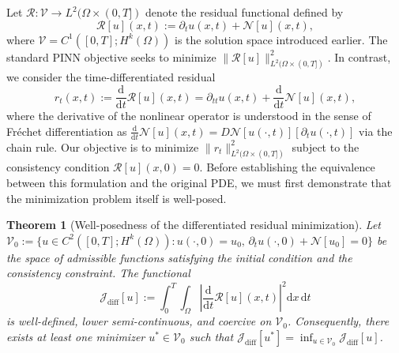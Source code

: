 \documentclass[11pt,reqno]{amsart}
\theoremstyle{plain}
\newtheorem{theorem}{Theorem}[section]
\theoremstyle{definition}
\theoremstyle{remark}
\begin{document}
\noindent Let $\mathcal{R}: \mathcal{V} \to L^2(\Omega \times (0,T])$ denote the residual functional defined by
\begin{equation}\label{eq:residual_functional}
    \mathcal{R}[u](x,t) := \partial_t u(x,t) + \mathcal{N}[u](x,t),
\end{equation}
where $\mathcal{V} = C^1([0,T]; H^k(\Omega))$ is the solution space introduced earlier. The standard PINN objective seeks to minimize $\|\mathcal{R}[u]\|_{L^2(\Omega \times (0,T])}^2$. In contrast, we consider the time-differentiated residual
\begin{equation}\label{eq:differentiated_residual}
    r_t(x,t) := \frac{\mathrm{d}}{\mathrm{d}t} \mathcal{R}[u](x,t) = \partial_{tt} u(x,t) + \frac{\mathrm{d}}{\mathrm{d}t} \mathcal{N}[u](x,t),
\end{equation}
where the derivative of the nonlinear operator is understood in the sense of Fréchet differentiation as $\frac{\mathrm{d}}{\mathrm{d}t}\mathcal{N}[u](x,t) = D\mathcal{N}[u(\cdot,t)][\partial_t u(\cdot,t)]$ via the chain rule. Our objective is to minimize $\|r_t\|_{L^2(\Omega \times (0,T])}^2$ subject to the consistency condition $\mathcal{R}[u](x,0) = 0$. Before establishing the equivalence between this formulation and the original PDE, we must first demonstrate that the minimization problem itself is well-posed.

\begin{theorem}[Well-posedness of the differentiated residual minimization]\label{thm:wellposed_minimization}
Let $\mathcal{V}_0 := \{ u \in C^2([0,T]; H^k(\Omega)) : u(\cdot,0) = u_0, \, \partial_t u(\cdot,0) + \mathcal{N}[u_0] = 0 \}$ be the space of admissible functions satisfying the initial condition and the consistency constraint. The functional
\begin{equation}\label{eq:diff_residual_functional}
    \mathcal{J}_{\mathrm{diff}}[u] := \int_0^T \int_\Omega \left| \frac{\mathrm{d}}{\mathrm{d}t}\mathcal{R}[u](x,t) \right|^2 \mathrm{d}x \, \mathrm{d}t
\end{equation}
is well-defined, lower semi-continuous, and coercive on $\mathcal{V}_0$. Consequently, there exists at least one minimizer $u^* \in \mathcal{V}_0$ such that $\mathcal{J}_{\mathrm{diff}}[u^*] = \inf_{u \in \mathcal{V}_0} \mathcal{J}_{\mathrm{diff}}[u]$.
\end{theorem}
\end{document}

